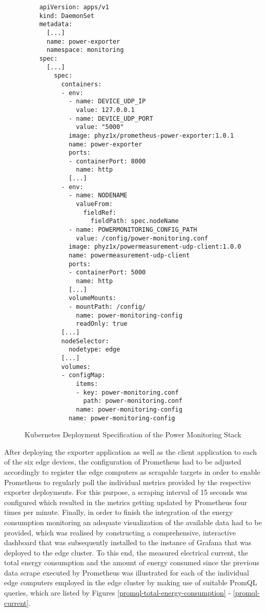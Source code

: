 \begin{figure}[H]
    \centering
    \begin{verbatim}
    apiVersion: apps/v1
    kind: DaemonSet
    metadata:
      [...]
      name: power-exporter
      namespace: monitoring
    spec:
      [...]
        spec:
          containers:
          - env:
            - name: DEVICE_UDP_IP
              value: 127.0.0.1
            - name: DEVICE_UDP_PORT
              value: "5000"
            image: phyz1x/prometheus-power-exporter:1.0.1
            name: power-exporter
            ports:
            - containerPort: 8000
              name: http
            [...]
          - env:
            - name: NODENAME
              valueFrom:
                fieldRef:
                  fieldPath: spec.nodeName
            - name: POWERMONITORING_CONFIG_PATH
              value: /config/power-monitoring.conf
            image: phyz1x/powermeasurement-udp-client:1.0.0
            name: powermeasurement-udp-client
            ports:
            - containerPort: 5000
              name: http
            [...]
            volumeMounts:
            - mountPath: /config/
              name: power-monitoring-config
              readOnly: true
          [...]
          nodeSelector:
            nodetype: edge
          [...]
          volumes:
          - configMap:
              items:
              - key: power-monitoring.conf
                path: power-monitoring.conf
              name: power-monitoring-config
            name: power-monitoring-config
    \end{verbatim}
    \caption{Kubernetes Deployment Specification of the Power Monitoring Stack}
    \label{k8s-daemonset}
\end{figure}


After deploying the exporter application as well as the client application to each of the six edge devices, the configuration of Prometheus had to be adjusted accordingly to register the edge computers as scrapable targets in order to enable Prometheus to regularly poll the individual metrics provided by the respective exporter deployments. For this purpose, a scraping interval of 15 seconds was configured which resulted in the metrics getting updated by Prometheus four times per minute. Finally, in order to finish the integration of the energy consumption monitoring an adequate visualization of the available data had to be provided, which was realised by constructing a comprehensive, interactive dashboard that was subsequently installed to the instance of Grafana that was deployed to the edge cluster. To this end, the measured electrical current, the total energy consumption and the amount of energy consumed since the previous data scrape executed by Prometheus was illustrated for each of the individual edge computers employed in the edge cluster by making use of suitable PromQL queries, which are listed by Figures \ref{promql-total-energy-consumption} - \ref{promql-current}.

